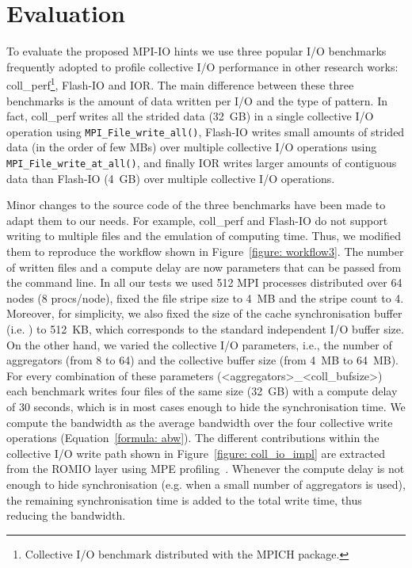 \section{Evaluation}
\label{sec: evaluation}
To evaluate the proposed MPI-IO hints we use three popular I/O benchmarks frequently adopted to profile collective I/O performance in other research works: coll\_perf\footnote{Collective I/O benchmark distributed with the MPICH package.}, Flash-IO and IOR. The main difference between these three benchmarks is the amount of data written per I/O and the type of pattern. In fact, coll\_perf writes all the strided data (32~GB) in a single collective I/O operation using \texttt{MPI\_File\_write\_all()}, Flash-IO writes small amounts of strided data (in the order of few MBs) over multiple collective I/O operations using \texttt{MPI\_File\_write\_at\_all()}, and finally IOR writes larger amounts of contiguous data than Flash-IO (4~GB) over multiple collective I/O operations.

Minor changes to the source code of the three benchmarks have been made to adapt them to our needs. For example, coll\_perf and Flash-IO do not support writing to multiple files and the emulation of computing time. Thus, we modified them to reproduce the workflow shown in Figure~\ref{figure: workflow3}. The number of written files and a compute delay are now parameters that can be passed from the command line. In all our tests we used 512 MPI processes distributed over 64 nodes (8 procs/node), fixed the file stripe size to 4~MB and the stripe count to 4. Moreover, for simplicity, we also fixed the size of the cache synchronisation buffer (i.e. ) to 512~KB, which corresponds to the standard independent I/O buffer size. On the other hand, we varied the collective I/O parameters, i.e., the number of aggregators (from 8 to 64) and the collective buffer size (from 4~MB to 64~MB). For every combination of these parameters (<aggregators>\_<coll\_bufsize>) each benchmark writes four files of the same size (32~GB) with a compute delay of 30 seconds, which is in most cases enough to hide the synchronisation time. We compute the bandwidth as the average bandwidth over the four collective write operations (Equation~\ref{formula: abw}). The different  contributions within the collective I/O write path shown in Figure~\ref{figure: coll_io_impl} are extracted from the ROMIO layer using MPE profiling~\cite{mpe}.
Whenever the compute delay is not enough to hide synchronisation (e.g. when a small number of aggregators is used), the remaining synchronisation time is added to the total write time, thus reducing the bandwidth.

